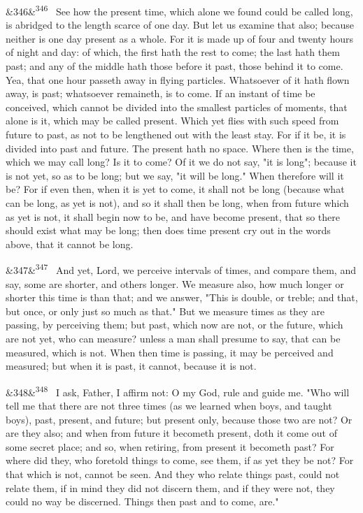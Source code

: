 \documentclass[12pt]{article}
\newcommand{\para}[1][]{\par\noindent\ifx&#1&\else\textsuperscript{\footnotesize #1}~\fi}
\begin{document}
\para[346] See how the present time, which alone we found could be called long, is abridged to the length scarce of one day. But let us examine that also; because neither is one day present as a whole. For it is made up of four and twenty hours of night and day: of which, the first hath the rest to come; the last hath them past; and any of the middle hath those before it past, those behind it to come. Yea, that one hour passeth away in flying particles. Whatsoever of it hath flown away, is past; whatsoever remaineth, is to come. If an instant of time be conceived, which cannot be divided into the smallest particles of moments, that alone is it, which may be called present. Which yet flies with such speed from future to past, as not to be lengthened out with the least stay. For if it be, it is divided into past and future. The present hath no space. Where then is the time, which we may call long? Is it to come? Of it we do not say, "it is long"; because it is not yet, so as to be long; but we say, "it will be long." When therefore will it be? For if even then, when it is yet to come, it shall not be long (because what can be long, as yet is not), and so it shall then be long, when from future which as yet is not, it shall begin now to be, and have become present, that so there should exist what may be long; then does time present cry out in the words above, that it cannot be long.

\para[347] And yet, Lord, we perceive intervals of times, and compare them, and say, some are shorter, and others longer. We measure also, how much longer or shorter this time is than that; and we answer, "This is double, or treble; and that, but once, or only just so much as that." But we measure times as they are passing, by perceiving them; but past, which now are not, or the future, which are not yet, who can measure? unless a man shall presume to say, that can be measured, which is not. When then time is passing, it may be perceived and measured; but when it is past, it cannot, because it is not.

\para[348] I ask, Father, I affirm not: O my God, rule and guide me. "Who will tell me that there are not three times (as we learned when boys, and taught boys), past, present, and future; but present only, because those two are not? Or are they also; and when from future it becometh present, doth it come out of some secret place; and so, when retiring, from present it becometh past? For where did they, who foretold things to come, see them, if as yet they be not? For that which is not, cannot be seen. And they who relate things past, could not relate them, if in mind they did not discern them, and if they were not, they could no way be discerned. Things then past and to come, are."
\end{document}
